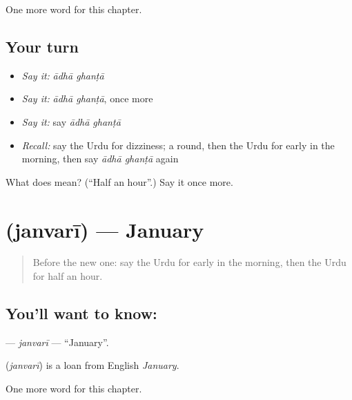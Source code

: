 \begin{grammarlens}[title={What you've built}]
One more word for this chapter.
\end{grammarlens}

\subsection*{Your turn}
\begin{itemize}
\raggedright
  \item \emph{Say it:} \emph{ādhā ghanṭā}
  \item \emph{Say it:} \emph{ādhā ghanṭā}, once more
  \item \emph{Say it:} say \emph{ādhā ghanṭā}
  \item \emph{Recall:} say the Urdu for dizziness; a round, then the Urdu for early in the morning, then say \emph{ādhā ghanṭā} again
\end{itemize}

\begin{tcolorbox}[breakable,colback=teal!4,colframe=teal!35!black,title={Before you move on}]
What does   mean? (\textquotedblleft{}Half an hour\textquotedblright{}.) Say it once more.
\end{tcolorbox}
\section[\texorpdfstring{\ur{جنوری} (janvarī)}{جنوری (janvarī)}]{ (janvarī) — January}

\label{lesson:UR-C155-janvari}



\begin{quote}
Before the new one: say the Urdu for early in the morning, then the Urdu for half an hour.
\end{quote}

\subsection*{You'll want to know: }
\textbf{} — \emph{janvarī} — \textquotedblleft{}January\textquotedblright{}.

\begin{cousinweb}
\textbf{} (\emph{janvarī}) is a loan from English \emph{January}.
\end{cousinweb}

\begin{grammarlens}[title={What you've built}]
One more word for this chapter.
\end{grammarlens}

